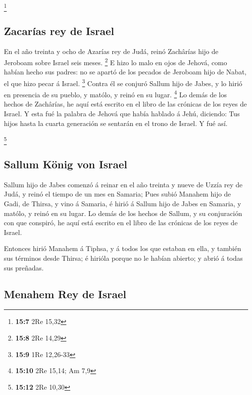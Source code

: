 \footnote{\textbf{15:7} 2Re 15,32}

\hypertarget{zacaruxedas-rey-de-israel}{%
\subsection{Zacarías rey de Israel}\label{zacaruxedas-rey-de-israel}}

 En el año treinta y ocho de Azarías rey de Judá, reinó
Zachârías hijo de Jeroboam sobre Israel seis meses. \footnote{\textbf{15:8}
  2Re 14,29}  E hizo lo malo en ojos de Jehová, como habían
hecho sus padres: no se apartó de los pecados de Jeroboam hijo de Nabat,
el que hizo pecar á Israel. \footnote{\textbf{15:9} 1Re 12,26-33}
 Contra él se conjuró Sallum hijo de Jabes, y lo hirió en
presencia de su pueblo, y matólo, y reinó en su lugar. \footnote{\textbf{15:10}
  2Re 15,14; Am 7,9}  Lo demás de los hechos de Zachârías,
he aquí está escrito en el libro de las crónicas de los reyes de Israel.
 Y esta fué la palabra de Jehová que había hablado á Jehú,
diciendo: Tus hijos hasta la cuarta generación se sentarán en el trono
de Israel. Y fué así.

\footnote{\textbf{15:12} 2Re 10,30}

\hypertarget{sallum-kuxf6nig-von-israel}{%
\subsection{Sallum König von Israel}\label{sallum-kuxf6nig-von-israel}}

 Sallum hijo de Jabes comenzó á reinar en el año treinta y
nueve de Uzzía rey de Judá, y reinó el tiempo de un mes en Samaria;
 Pues subió Manahem hijo de Gadi, de Thirsa, y vino á
Samaria, é hirió á Sallum hijo de Jabes en Samaria, y matólo, y reinó en
su lugar.  Lo demás de los hechos de Sallum, y su
conjuración con que conspiró, he aquí está escrito en el libro de las
crónicas de los reyes de Israel.

 Entonces hirió Manahem á Tiphsa, y á todos los que estaban
en ella, y también sus términos desde Thirsa; é hirióla porque no le
habían abierto; y abrió á todas sus preñadas.

\hypertarget{menahem-rey-de-israel}{%
\subsection{Menahem Rey de Israel}\label{menahem-rey-de-israel}}

